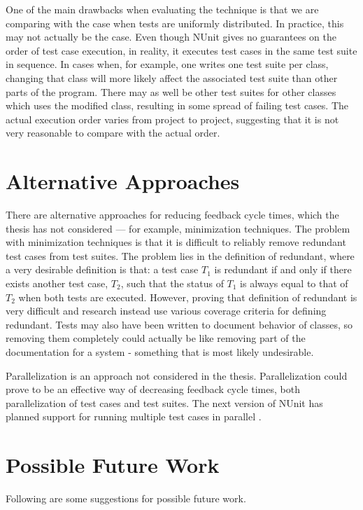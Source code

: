 \documentclass[a4paper,english,12pt]{report}
\begin{document}
One of the main drawbacks when evaluating the technique is that we are comparing with the case when tests are uniformly distributed. In practice, this may not actually be the case. Even though NUnit gives no guarantees on the order of test case execution, in reality, it executes test cases in the same test suite in sequence. In cases when, for example, one writes one test suite per class, changing that class will more likely affect the associated test suite than other parts of the program. There may as well be other test suites for other classes which uses the modified class, resulting in some spread of failing test cases. The actual execution order varies from project to project, suggesting that it is not very reasonable to compare with the actual order.

\section{Alternative Approaches}\label{sec:alternative-approaches}
There are alternative approaches for reducing feedback cycle times, which the thesis has not considered --- for example, minimization techniques. The problem with minimization techniques is that it is difficult to reliably remove redundant test cases from test suites. The problem lies in the definition of redundant, where a very desirable definition is that: a test case $T_1$ is redundant if and only if there exists another test case, $T_2$, such that the status of $T_1$ is always equal to that of $T_2$ when both tests are executed. However, proving that definition of redundant is very difficult and research instead use various coverage criteria for defining redundant. Tests may also have been written to document behavior of classes, so removing them completely could actually be like removing part of the documentation for a system - something that is most likely undesirable.

Parallelization is an approach not considered in the thesis. Parallelization could prove to be an effective way of decreasing feedback cycle times, both parallelization of test cases and test suites. The next version of NUnit has planned support for running multiple test cases in parallel \citep{poole2013parallel}.

\section{Possible Future Work}
Following are some suggestions for possible future work.
\end{document}
